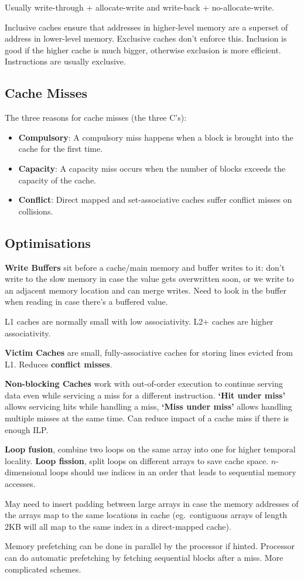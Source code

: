 \documentclass[11pt]{article}
\begin{document}
{{        Usually write-through + allocate-write and write-back + no-allocate-write.

        Inclusive caches ensure that addresses in higher-level memory are a superset of address in lower-level memory. Exclusive caches don't enforce this. Inclusion is good if the higher cache is much bigger, otherwise exclusion is more efficient. Instructions are usually exclusive.
    }
    \subsection*{Cache Misses}
    {
        The three reasons for cache misses (the three C's):

        \begin{itemize}
        \item \textbf{Compulsory}: A compulsory miss happens when a block is brought into the cache for the first time.
        \item \textbf{Capacity}: A capacity miss occurs when the number of blocks exceeds the capacity of the cache.
        \item \textbf{Conflict}: Direct mapped and set-associative caches suffer conflict misses on collisions.
        \end{itemize}
    }
    \subsection*{Optimisations}
    {
        \textbf{Write Buffers} sit before a cache/main memory and buffer writes to it: don't write to the slow memory in case the value gets overwritten soon, or we write to an adjacent memory location and can merge writes. Need to look in the buffer when reading in case there's a buffered value.

        L1 caches are normally small with low associativity. L2+ caches are higher associativity.

        \textbf{Victim Caches} are small, fully-associative caches for storing lines evicted from L1. Reduces \textbf{conflict misses}.

        \textbf{Non-blocking Caches} work with out-of-order execution to continue serving data even while servicing a miss for a different instruction. \textbf{`Hit under miss'} allows servicing hits while handling a miss, \textbf{`Miss under miss'} allows handling multiple misses at the same time. Can reduce impact of a cache miss if there is enough ILP.

        \textbf{Loop fusion}, combine two loops on the same array into one for higher temporal locality. \textbf{Loop fission}, split loops on different arrays to save cache space. \(n\)-dimensional loops should use indices in an order that leads to sequential memory accesses.

        May need to insert padding between large arrays in case the memory addresses of the arrays map to the same locations in cache (eg.\ contiguous arrays of length 2KB will all map to the same index in a direct-mapped cache).

        Memory prefetching can be done in parallel by the processor if hinted. Processor can do automatic prefetching by fetching sequential blocks after a miss. More complicated schemes.
    }
}
\end{document}
